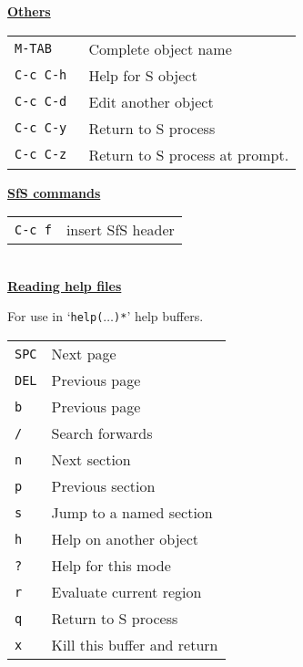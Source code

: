\underline{\bf Others}\\
\begin{tabular}{p{1.5cm}l}
{\tt M-TAB} & Complete object name \\
{\tt C-c C-h }& Help for S object \\
{\tt C-c C-d }& Edit another object \\
{\tt C-c C-y} & Return to S process \\
{\tt C-c C-z} & Return to S process at prompt.
\end{tabular}

\underline{\bf SfS commands}\\
\begin{tabular}{p{1.5cm}l}
{\tt C-c f} & insert SfS header \\
\end{tabular}\\[0.5cm]

\underline{\large\bf Reading help files}

For use in `{\tt *help($\ldots$)*}' help buffers.

\begin{tabular}{p{1.5cm}l}
{\tt SPC} & Next page \\
{\tt DEL} & Previous page \\
{\tt b}   & Previous page \\
{\tt /}   & Search forwards \\
{\tt n}   & Next section \\
{\tt p}   & Previous section \\
{\tt s}   & Jump to a named section \\
{\tt h}   & Help on another object \\
{\tt ?}   & Help for this mode \\
{\tt r}   & Evaluate current region \\
{\tt q}   & Return to S process \\
{\tt x}   & Kill this buffer and return \\
\end{tabular}



